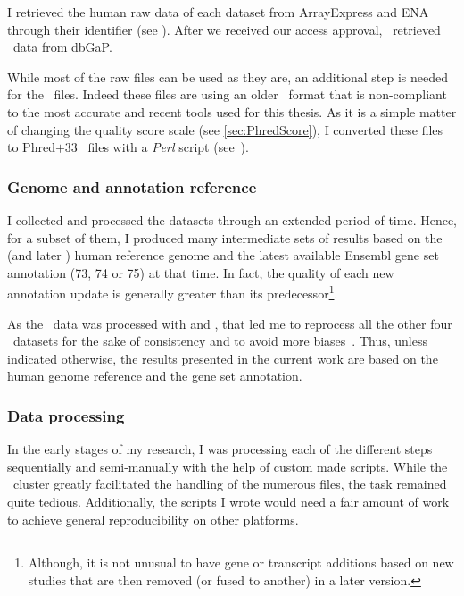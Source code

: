I retrieved the human raw data of each dataset from \gls{ArrayExpress} and
\gls{ENA} through their identifier (see ). After we
received our access approval, \nuno\ retrieved \Gtex\ data from
\gls{dbGaP}.

While most of the raw files can be used as they are, an additional step is
needed for the \castle\ files. Indeed these files are using an older
\fastq\ format that is non-compliant to the most accurate and recent tools used
for this thesis.
As it is a simple matter of changing the quality score scale
(see \cref{sec:PhredScore}),
I converted these files to \gls{Phred}$+33$ \fastq\ files with a
\emph{\gls{Perl}} script (see~).

\subsubsection{Genome and annotation reference}

I collected and processed the datasets through an extended period of time.
Hence, for a subset of them,
I produced many intermediate sets of results based on the 
(and later ) human reference genome and the latest available
\gls{Ensembl} gene set annotation (73, 74 or 75) at that time.
In fact, the quality of each new annotation update is
generally greater than its predecessor\footnote{Although,
it is not unusual to have gene or transcript additions based on new studies
that are then removed (or fused to another) in a later version.
}.

As the \gtex\ data was processed with  and , that led me
to reprocess all the other four \Rnaseq\ datasets for the sake of consistency and
to avoid more biases~. Thus, unless indicated
otherwise, the results presented in the current work are
based on the  human genome reference and the  gene set annotation.


\subsubsection{Data processing}\label{subsubsec:RnaseqDataProc}

In the early stages of my research, I was processing each of the different steps
sequentially and semi-manually with the help of custom made scripts. While the
\EBI\ \gls{cluster} greatly facilitated the handling of the numerous files,
the task remained quite tedious.
Additionally,
the scripts I wrote would need a fair amount of work to achieve general
reproducibility on other platforms.

